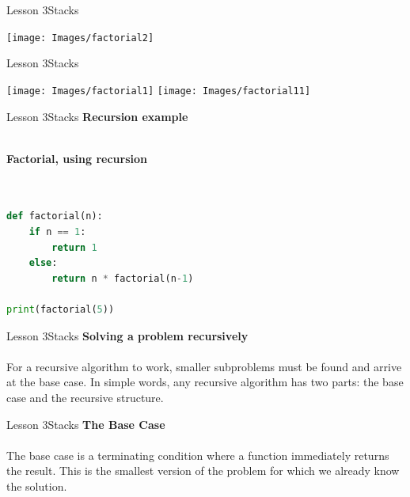 \documentclass[aspectratio=1610]{beamer}
\begin{document}
\begin{frame}{Lesson 3}{Stacks}
\begin{center}
\texttt{[image: Images/factorial2]}
\end{center}
\end{frame}



\begin{frame}{Lesson 3}{Stacks}
\begin{center}
\texttt{[image: Images/factorial1]}
\texttt{[image: Images/factorial11]}
\end{center}
\end{frame}



\begin{frame}{Lesson 3}{Stacks}
\Large
\textbf{Recursion example}\\~\\
\label{factorial}
\begin{algorithmic}[1]
    \State {}
\Else
    \State {}
\EndIf
\EndProcedure
\end{algorithmic}
\end{frame}


\begin{frame}[fragile]
\Large
\textbf{Factorial, using recursion}\\~\\
\begin{lstlisting}[language=Python]

def factorial(n):
    if n == 1:
        return 1
    else:
        return n * factorial(n-1)

print(factorial(5))
 \end{lstlisting}
\end{frame} 


\begin{frame}{Lesson 3}{Stacks}
\LARGE
\textbf{Solving a problem recursively}\\~\\
For a recursive algorithm to work, smaller subproblems must
be found and arrive at the base case. In simple words, any recursive
algorithm has two parts: the base case and the recursive structure.
\end{frame}


\begin{frame}{Lesson 3}{Stacks}
\LARGE
\textbf{The Base Case}\\~\\
The base case is a terminating condition where a function
immediately returns the result. This is the smallest version of the
problem for which we already know the solution.
\end{frame}
\end{document}
